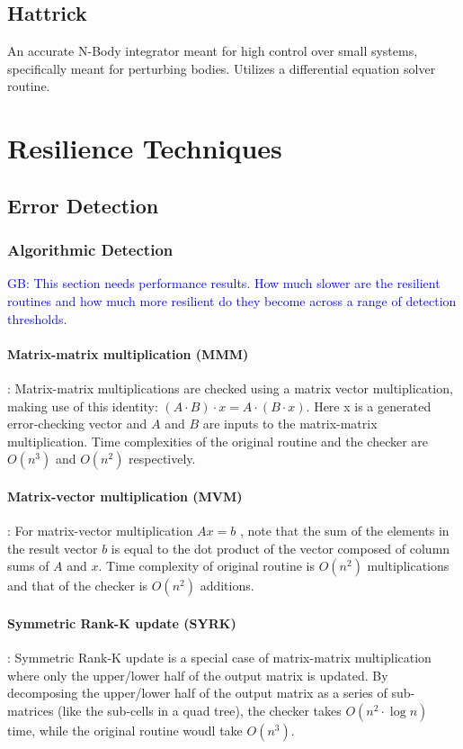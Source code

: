 \documentclass[prodmode,acmtecs]{acmconf} %
\newcommand{\greg}[1]{%
  \textcolor{blue}{GB: #1}
}
\begin{document}
\subsection{Hattrick}
\label{sec:apps:hattrick}
An accurate N-Body integrator meant for high control over small systems, specifically meant for perturbing bodies. Utilizes a differential equation solver routine.

\section{Resilience Techniques}
\label{sec:res_tech}

\subsection{Error Detection}
\label{sec:res_tech:err_det}

\subsubsection{Algorithmic Detection}
\label{sec:res_tech:err_det:algo}

\greg{This section needs performance results. How much slower are the resilient routines and how much more resilient do they become across a range of detection thresholds.}

\paragraph{Matrix-matrix multiplication (MMM)}:
Matrix-matrix multiplications are checked using a matrix vector multiplication, making use of this identity: $(A \cdot B) \cdot x = A \cdot (B \cdot x)$. Here x is a generated error-checking vector and $A$ and $B$ are inputs to the matrix-matrix multiplication. Time complexities of the original routine and the checker are $O(n^3)$ and $O(n^2)$ respectively.


\paragraph{Matrix-vector multiplication (MVM)}:
For matrix-vector multiplication $Ax=b$ , note that the sum of the elements in the result vector $b$ is equal to the dot product of the vector composed of column sums of $A$ and $x$. Time complexity of original routine is $O(n^2)$ multiplications and that of the checker is $O(n^2)$ additions.

\paragraph{Symmetric Rank-K update (SYRK)}:
Symmetric Rank-K update is a special case of matrix-matrix multiplication where only the upper/lower half of the output matrix is updated. By decomposing the upper/lower half of the output matrix as a series of sub-matrices (like the sub-cells in a quad tree), the checker takes $O(n^2 \cdot \log{n})$ time, while the original routine woudl take $O(n^3)$.
\end{document}
